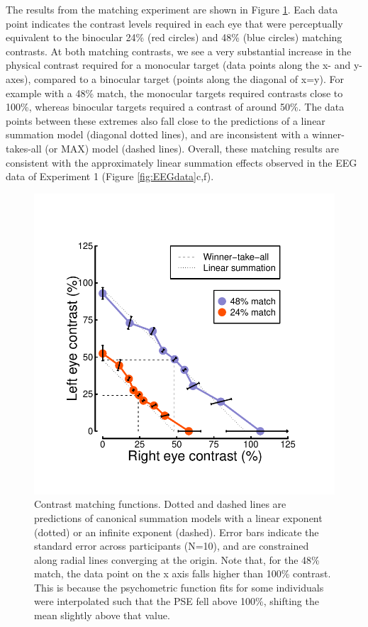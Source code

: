 \documentclass[
]{article}
\begin{document}
The results from the matching experiment are shown in Figure \ref{fig:matchingdata}. Each data point indicates the contrast levels required in each eye that were perceptually equivalent to the binocular 24\% (red circles) and 48\% (blue circles) matching contrasts. At both matching contrasts, we see a very substantial increase in the physical contrast required for a monocular target (data points along the x- and y-axes), compared to a binocular target (points along the diagonal of x=y). For example with a 48\% match, the monocular targets required contrasts close to 100\%, whereas binocular targets required a contrast of around 50\%. The data points between these extremes also fall close to the predictions of a linear summation model (diagonal dotted lines), and are inconsistent with a winner-takes-all (or MAX) model (dashed lines). Overall, these matching results are consistent with the approximately linear summation effects observed in the EEG data of Experiment 1 (Figure \ref{fig:EEGdata}c,f).

\begin{figure}

{\centering \includegraphics[width=0.5\linewidth]{Figures/matchingdata} 

}

\caption{Contrast matching functions. Dotted and dashed lines are predictions of canonical summation models with a linear exponent (dotted) or an infinite exponent (dashed). Error bars indicate the standard error across participants (N=10), and are constrained along radial lines converging at the origin. Note that, for the {48\%} match, the data point on the x axis falls higher than {100\%} contrast. This is because the psychometric function fits for some individuals were interpolated such that the PSE fell above {100\%}, shifting the mean slightly above that value.}\label{fig:matchingdata}
\end{figure}
\end{document}
